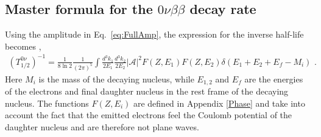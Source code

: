 \documentclass[letterpaper,11pt]{article}
\newcommand{\dt}{\delta}
\newcommand{\bea}{\begin{eqnarray}}
\newcommand{\eea}{\end{eqnarray}}
\newcommand{\sq}{^{2}}
\begin{document}
\subsection{Master formula for the $0\nu\beta\beta$ decay rate}
Using the amplitude in Eq.\ \eqref{eq:FullAmp}, the expression for the inverse half-life becomes \cite{Doi:1985dx,Bilenky:2014uka},
\bea \label{eq:InvHalfLife}
\left(T^{0\nu}_{1/2}\right)^{-1} = \frac{1}{8 \ln 2}\frac{1}{(2\pi)^5 }\int \frac{d^3k_1}{2E_1}\frac{d^3k_2}{2E_2} |\mathcal A |\sq F(Z,E_1)F(Z,E_2)\dt(E_1+E_2+E_f-M_i)\,\,.
\eea
Here $M_i$ is the mass of the decaying nucleus, while $E_{1,2}$  and $E_f$ are 
 the energies of the electrons and final daughter nucleus  in the rest frame of the decaying nucleus.
The functions $F(Z,E_i)$ are defined in Appendix \ref{Phase} and take into account the fact that the emitted electrons feel the Coulomb potential of the daughter nucleus and are therefore not plane waves. 
\end{document}
